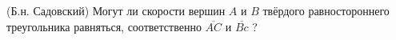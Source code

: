 (Б.н. Садовский)
Могут ли скорости вершин $A$ и $B$ твёрдого равностороннего треугольника
равняться, соответственно $\overline{AC}$ и $\overline{Bc}$ ?
